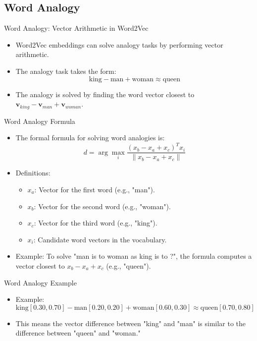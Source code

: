 \documentclass[serif, aspectratio=169]{beamer}
\begin{document}
\subsection{Word Analogy}

\begin{frame}{Word Analogy: Vector Arithmetic in Word2Vec}
    \begin{itemize}
        \item Word2Vec embeddings can solve analogy tasks by performing vector arithmetic.
        \item The analogy task takes the form:
        \[
        \text{king} - \text{man} + \text{woman} \approx \text{queen}
        \]
        \item The analogy is solved by finding the word vector closest to \( \mathbf{v}_{king} - \mathbf{v}_{man} + \mathbf{v}_{woman} \).
    \end{itemize}
\end{frame}


\begin{frame}{Word Analogy Formula}
	\begin{itemize}
		\item The formal formula for solving word analogies is:
		\[
		d = \arg\max_i \frac{(x_b - x_a + x_c)^T x_i}{\|x_b - x_a + x_c\|}
		\]
		\item Definitions:
		\begin{itemize}
			\item \(x_a\): Vector for the first word (e.g., "man").
			\item \(x_b\): Vector for the second word (e.g., "woman").
			\item \(x_c\): Vector for the third word (e.g., "king").
			\item \(x_i\): Candidate word vectors in the vocabulary.
		\end{itemize}
		\item Example: To solve "man is to woman as king is to ?", the formula computes a vector closest to \(x_b - x_a + x_c\) (e.g., "queen").
	\end{itemize}
\end{frame}


\begin{frame}{Word Analogy Example}
    \begin{itemize}
        \item Example:
        \[
        \text{king}[0.30, 0.70] - \text{man}[0.20, 0.20] + \text{woman}[0.60, 0.30] \approx \text{queen}[0.70, 0.80]
        \]
        \item This means the vector difference between "king" and "man" is similar to the difference between "queen" and "woman."
    \end{itemize}
\end{frame}
\end{document}
